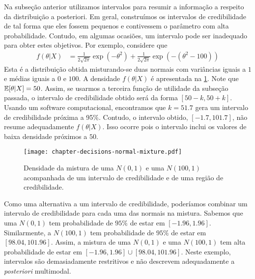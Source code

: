 Na subseção anterior utilizamos 
intervalos para resumir a informação a respeito 
da distribuição a posteriori.
Em geral, construímos os intervalos de credibilidade
de tal forma que eles fossem pequenos e 
contivessem o parâmetro com alta probabilidade.
Contudo, em algumas ocasiões, 
um intervalo pode ser inadequado para obter estes objetivos.
Por exemplo, considere que
\begin{align*}
 f(\theta|X)
 &= \frac{1}{2\sqrt{2\pi}}\exp(-\theta^{2})
 +\frac{1}{2\sqrt{2\pi}}\exp(-(\theta^{2}-100))
\end{align*}
Esta é a distribuição obtida misturando-se 
duas normais com  variâncias iguais a $1$ e 
médias iguais a $0$ e $100$.
A densidade $f(\theta|X)$ é apresentada na
\cref{figure:normal-mixture-1}.
Note que ${\mathbb E}[\theta|X] = 50$.
Assim, se usarmos a terceira 
função de utilidade da subseção passada,
o intervalo de credibilidade obtido será
da forma $[50-k,50+k]$.
Usando um software computacional,
encontramos que $k=51.7$ gera 
um intervalo de credibilidade próxima a 95\%.
Contudo, o intervalo obtido, $[-1.7,101.7]$, 
não resume adequadamente $f(\theta|X)$.
Isso ocorre pois o intervalo inclui 
os valores de baixa densidade próximos a $50$.
\begin{figure}
 \centering
 \texttt{[image: chapter-decisions-normal-mixture.pdf]}
 \caption{Densidade da mistura de 
 uma $N(0,1)$ e uma $N(100,1)$
 acompanhada de um intervalo de credibilidade e
 de uma região de credibilidade.}
 \label{figure:normal-mixture-1}
\end{figure}

Como uma alternativa a um 
intervalo de credibilidade,
poderíamos combinar um 
intervalo de credibilidade para cada 
uma das normais na mistura.
Sabemos que uma $N(0,1)$ tem 
probabilidade de $95\%$ de estar em $[-1.96,1.96]$.
Similarmente, a $N(100,1)$ tem 
probabilidade de $95\%$ de estar em $[98.04,101.96]$.
Assim, a mistura de 
uma $N(0,1)$ e uma $N(100,1)$ tem 
alta probabilidade de estar em 
$[-1.96,1.96] \cup [98.04,101.96]$.
Neste exemplo, intervalos são 
demasiadamente restritivos e 
não descrevem adequadamente 
a \emph{posteriori} multimodal.

